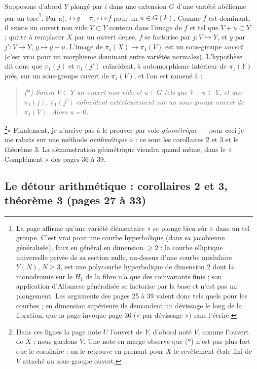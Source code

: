 \documentclass[11pt,a4paper]{article}
\begin{document}
Supposons d'abord $Y$ plongé par $i$ dans une extension $G$ d'une variété
abélienne par un tore\footnote{La page affirme qu'une variété élémentaire
« se plonge bien sûr » dans un tel groupe. C'est vrai pour une courbe
hyperbolique (dans sa jacobienne généralisée), faux en général en dimension
$\ge 2$ : la courbe elliptique universelle privée de sa section nulle,
au-dessus d'une courbe modulaire $Y(N)$, $N \ge 3$, est une polycourbe
hyperbolique de dimension $2$ dont la monodromie sur le $H_1$ de la fibre n'a
que des coinvariants finis ; son application d'Albanese généralisée se
factorise par la base et n'est pas un plongement. Les arguments des pages 25 à
39 valent donc tels quels pour les courbes ; en dimension supérieure ils
demandent un dévissage le long de la fibration, que la page invoque page 36
(« par dévissage ») sans l'écrire.}. Par a), $i \circ g = \tau_u \circ i \circ
f$ pour un $u \in G(k)$. Comme $f$ est dominant, il existe un ouvert non vide
$V \subset Y$ contenu dans l'image de $f$ et tel que $V + u \subset Y$ ; quitte
à remplacer $X$ par un ouvert dense, $f$ se factorise par $j : V \hookrightarrow
Y$, et $g$ par $j' : V \to Y$, $y \mapsto y + u$. L'image de $\pi_1(X) \to
\pi_1(V)$ est un sous-groupe \emph{ouvert} (c'est vrai pour un morphisme
dominant entre variétés normales). L'hypothèse dit donc que $\pi_1(j)$ et
$\pi_1(j')$ coïncident, à automorphisme intérieur de $\pi_1(Y)$ près, sur un
sous-groupe ouvert de $\pi_1(V)$, et l'on est ramené à :

\begin{quote}
\emph{($\ast$) Soient $V \subset Y$ un ouvert non vide et $u \in G$ tels que
$V + u \subset Y$, et que $\pi_1(j)$, $\pi_1(j')$ coïncident extérieurement sur
un sous-groupe ouvert de $\pi_1(V)$. Alors $u = 0$.}
\end{quote}

\footnote{Dans ces lignes la page note $U$ l'ouvert de $Y$, d'abord noté $V$,
comme l'ouvert de $X$ ; nous gardons $V$. Une note en marge observe que ($\ast$)
n'est pas plus fort que le corollaire : on le retrouve en prenant pour $X$ le
revêtement étale fini de $V$ attaché au sous-groupe ouvert.}« Finalement, je
n'arrive pas à le prouver par voie \emph{géométrique} — pour ceci je me
rabats sur une méthode \emph{arithmétique} » : ce sont les corollaires 2 et 3
et le théorème 3. La démonstration géométrique viendra quand même, dans le
« Complément » des pages 36 à 39.

\subsection*{Le détour arithmétique : corollaires 2 et 3, théorème 3 (pages 27 à 33)}
\end{document}
